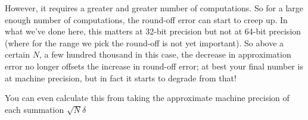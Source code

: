 However, it requires a greater and greater number of computations. So
for a large enough number of computations, the round-off error can
start to creep up. In what we've done here, this matters at 32-bit
precision but not at 64-bit precision (where for the range we pick the
round-off is not yet important). So above a certain $N$, a few hundred
thousand in this case, the decrease in approximation error no longer
offsets the increase in round-off error; at best your final number is
at machine precision, but in fact it starts to degrade from that!

You can even calculate this from taking the approximate machine
precision of each summation $\sqrt{N}\delta$

